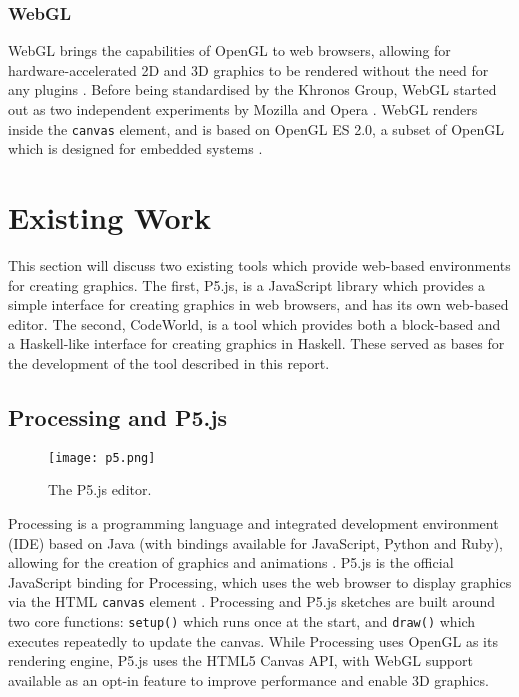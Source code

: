 \documentclass[../main.tex]{subfiles}
\begin{document}
            \subsubsection{WebGL}
                WebGL brings the capabilities of OpenGL to web browsers, allowing for
                    hardware-accelerated 2D and 3D graphics to be rendered without the need for any
                    plugins \citep{webGL}.
                Before being standardised by the Khronos Group, WebGL started out as two
                    independent experiments by Mozilla and Opera \citep{mozillaWebGL, operaWebGL}.
                WebGL renders inside the \texttt{canvas} element, and is based on OpenGL ES
                    2.0, a subset of OpenGL which is designed for embedded systems
                    \citep{openGLES}.

    \section{Existing Work}
        This section will discuss two existing tools which provide web-based
            environments for creating graphics.
        The first, P5.js, is a JavaScript library which provides a simple interface for
            creating graphics in web browsers, and has its own web-based editor.
        The second, CodeWorld, is a tool which provides both a block-based and a
            Haskell-like interface for creating graphics in Haskell.
        These served as bases for the development of the tool described in this report.

        \subsection{Processing and P5.js}
            \begin{figure}[H]
                \centering
                \texttt{[image: p5.png]}
                    \caption{The P5.js editor.}
                    \label{fig:p5}
            \end{figure}

            Processing is a programming language and integrated development environment
                (IDE) based on Java (with bindings available for JavaScript, Python and Ruby),
                allowing for the creation of graphics and animations \citep{processing}.
            P5.js is the official JavaScript binding for Processing, which uses the web
                browser to display graphics via the HTML \texttt{canvas} element \citep{p5js}.
            Processing and P5.js sketches are built around two core functions:
                \texttt{setup()} which runs once at the start, and \texttt{draw()} which
                executes repeatedly to update the canvas.
            While Processing uses OpenGL as its rendering engine, P5.js uses the HTML5
                Canvas API, with WebGL support available as an opt-in feature \citep{p5WebGL}
                to improve performance and enable 3D graphics.
\end{document}
